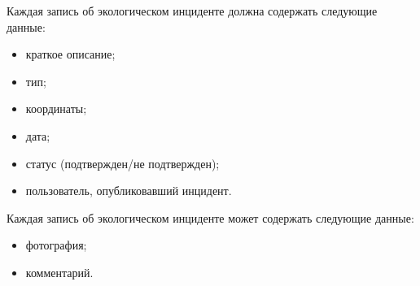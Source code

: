 Каждая запись об экологическом инциденте должна содержать следующие данные:
\begin{itemize}
	\item краткое описание;
	\item тип;
	\item координаты;
	\item дата;
	\item статус (подтвержден/не подтвержден);
	\item пользователь, опубликовавший инцидент.
\end{itemize}

Каждая запись об экологическом инциденте может содержать следующие данные:
\begin{itemize}
	\item фотография;
	\item комментарий.
\end{itemize}

